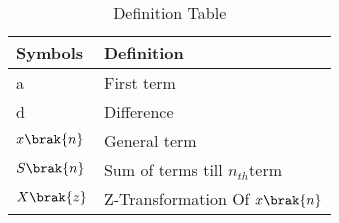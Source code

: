 \begin{table}[h]
\begin{tabular}{|l|l|}
\hline
\textbf{Symbols} & \textbf{Definition}\\ \hline
a & First term\\ \hline
d & Difference\\ \hline
$x\brak{n}$ & General term \\ \hline
$S\brak{n}$ & Sum of terms till $n_{th}$term \\ \hline
$X\brak{z}$ & Z-Transformation Of $x\brak{n}$\\ \hline
\end{tabular}
\caption{Definition Table}
\label{tab:ncert 10_5_3_3}
\end{table}
